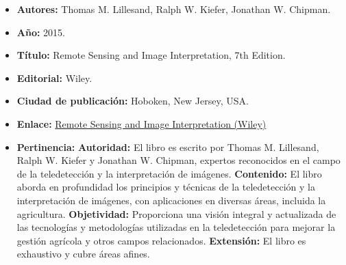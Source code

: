 \begin{itemize}
   \item \textbf{Autores:} Thomas M. Lillesand, Ralph W. Kiefer, Jonathan W. Chipman.
   \item \textbf{Año:} 2015.
  \item \textbf{Título:} Remote Sensing and Image Interpretation, 7th Edition.
  \item \textbf{Editorial:} Wiley.
  \item \textbf{Ciudad de publicación:} Hoboken, New Jersey, USA.
  \item \textbf{Enlace:} \href{https://www.wiley.com/en-us/Remote+Sensing+and+Image+Interpretation%2C+7th+Edition-p-9781118343289}{Remote Sensing and Image Interpretation (Wiley)}
  \item \textbf{Pertinencia:}
  \subitem \textbf{Autoridad:} El libro es escrito por Thomas M. Lillesand, Ralph W. Kiefer y Jonathan W. Chipman, expertos reconocidos en el campo de la teledetección y la interpretación de imágenes.
  \subitem \textbf{Contenido:} El libro aborda en profundidad los principios y técnicas de la teledetección y la interpretación de imágenes, con aplicaciones en diversas áreas, incluida la agricultura.
  \subitem \textbf{Objetividad:} Proporciona una visión integral y actualizada de las tecnologías y metodologías utilizadas en la teledetección para mejorar la gestión agrícola y otros campos relacionados.
  \subitem \textbf{Extensión:} El libro es exhaustivo y cubre áreas afines.
\end{itemize}
